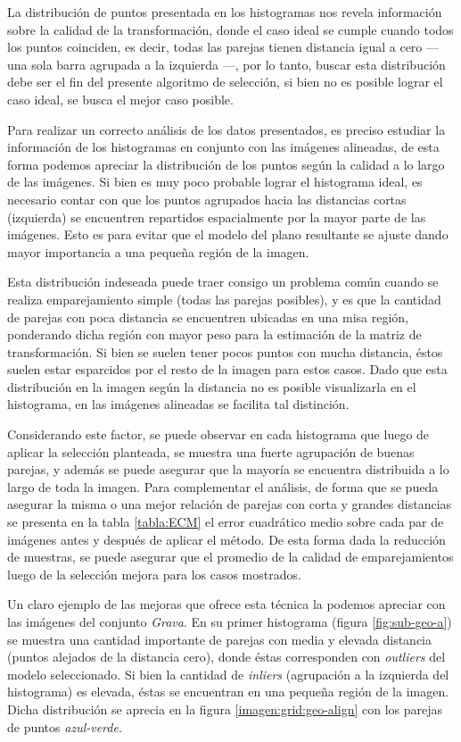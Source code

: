 La distribución de puntos presentada en los histogramas nos revela información sobre la calidad de la transformación, donde el caso ideal se cumple cuando todos los puntos coinciden, es decir, todas las parejas tienen distancia igual a cero --- una sola barra agrupada a la izquierda ---, por lo tanto, buscar esta distribución debe ser el fin del presente algoritmo de selección, si bien no es posible lograr el caso ideal, se busca el mejor caso posible. 

Para realizar un correcto análisis de los datos presentados, es preciso estudiar la información de los histogramas en conjunto con las imágenes alineadas, de esta forma podemos apreciar la distribución de los puntos según la calidad a lo largo de las imágenes. Si bien es muy poco probable lograr el histograma ideal, es necesario contar con que los puntos agrupados hacia las distancias cortas (izquierda) se encuentren repartidos espacialmente por la mayor parte de las imágenes. Esto es para evitar que el modelo del plano resultante se ajuste dando mayor importancia a una pequeña región de la imagen.

Esta distribución indeseada puede traer consigo un problema común cuando se realiza emparejamiento simple (todas las parejas posibles), y es que la cantidad de parejas con poca distancia se encuentren ubicadas en una misa región, ponderando dicha región con mayor peso para la estimación de la matriz de transformación. Si bien se suelen tener pocos puntos con mucha distancia, éstos suelen estar esparcidos por el resto de la imagen para estos casos. Dado que esta distribución en la imagen según la distancia no es posible visualizarla en el histograma, en las imágenes alineadas se facilita tal distinción.

Considerando este factor, se puede observar en cada histograma que luego de aplicar la selección planteada, se muestra una fuerte agrupación de buenas parejas, y además se puede asegurar que la mayoría se encuentra distribuida a lo largo de toda la imagen. Para complementar el análisis, de forma que se pueda asegurar la misma o una mejor relación de parejas con corta y grandes distancias se presenta en la tabla \ref{tabla:ECM} el error cuadrático medio sobre cada par de imágenes antes y después de aplicar el método. De esta forma dada la reducción de muestras, se puede asegurar que el promedio de la calidad de emparejamientos luego de la selección mejora para los casos mostrados.

Un claro ejemplo de las mejoras que ofrece esta técnica la podemos apreciar con las imágenes del conjunto \textit{Grava}. En su primer histograma (figura \ref{fig:sub-geo-a}) se muestra una cantidad importante de parejas con media y elevada distancia (puntos alejados de la distancia cero), donde éstas corresponden con \textit{outliers} del modelo seleccionado. Si bien la cantidad  de \textit{inliers} (agrupación a la izquierda del histograma) es elevada, éstas se encuentran en una pequeña región de la imagen. Dicha distribución se aprecia en la figura \ref{imagen:grid:geo-align} con los parejas de puntos \textit{azul-verde}. 

